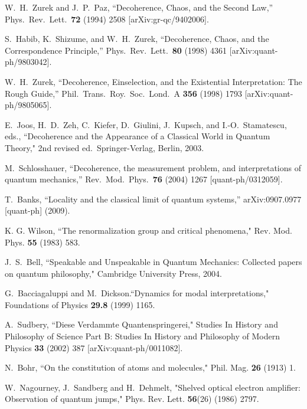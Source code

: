 \documentclass[12pt]{article}
\theoremstyle{plain}
\theoremstyle{definition}
\theoremstyle{remark}
\begin{document}
\begin{thebibliography}{99}
W.~H.~Zurek and J.~P.~Paz, ``Decoherence, Chaos, and the
Second Law,'' Phys.\ Rev.\ Lett.\ {\bf 72} (1994) 2508
[arXiv:gr-qc/9402006].

S.~Habib, K.~Shizume, and W.~H.~Zurek, ``Decoherence,
Chaos, and the Correspondence Principle,'' Phys.\ Rev.\ Lett.\ {\bf 80}
(1998) 4361 [arXiv:quant-ph/9803042].

W.~H.~Zurek, ``Decoherence, Einselection, and the
Existential Interpretation: The Rough Guide,'' Phil.\ Trans.\ Roy.\
Soc.\ Lond.\ A {\bf 356} (1998) 1793 [arXiv:quant-ph/9805065].

E.~Joos, H.~D.~Zeh, C.~Kiefer, D.~Giulini, J.~Kupsch,
and I.-O.~Stamatescu, eds., ``Decoherence and the Appearance of a
Classical World in Quantum Theory," 2nd revised ed.\ Springer-Verlag,
Berlin, 2003.
  
 
  M.~Schlosshauer,
  ``Decoherence, the measurement problem, and interpretations of quantum mechanics,''
  Rev.\ Mod.\ Phys.\  {\bf 76} (2004) 1267
  [quant-ph/0312059].


  T.~Banks,
  ``Locality and the classical limit of quantum systems,''
  arXiv:0907.0977 [quant-ph] (2009).
  


K. G. Wilson, ``The renormalization group and critical phenomena," Rev. Mod. Phys. {\bf55} (1983) 583.


J.~S.~Bell,
   ``Speakable and Unspeakable in Quantum Mechanics: Collected papers on quantum philosophy,"
   Cambridge University Press, 2004.

 
G.~Bacciagaluppi and M.~Dickson.``Dynamics for modal interpretations,"   Foundations of Physics {\bf 29.8} (1999) 1165.




A.~Sudbery, ``Diese Verdammte Quantenspringerei," Studies In History and Philosophy of Science Part B: Studies In History and Philosophy of Modern Physics
{\bf 33} (2002) 387 [arXiv:quant-ph/0011082].

 
N.~Bohr, ``On the constitution of atoms and molecules," Phil. Mag. {\bf 26} (1913) 1.


W.~Nagourney, J.~Sandberg and H.~Dehmelt, "Shelved optical electron amplifier: Observation of quantum jumps,"   Phys. Rev. Lett. {\bf56}(26) (1986) 2797.


\end{thebibliography}
\end{document}

